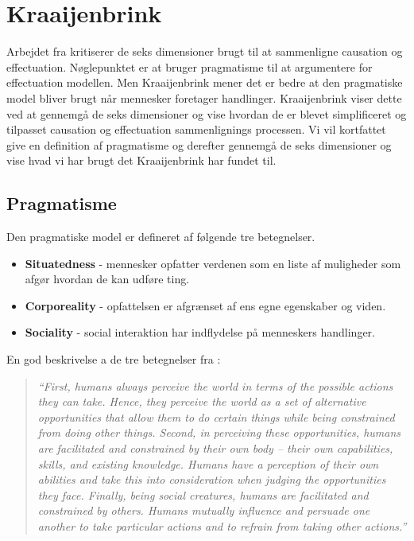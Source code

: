 \section{Kraaijenbrink}
Arbejdet fra \citet{kraaijenbrink2012nature} kritiserer de seks dimensioner brugt til at sammenligne causation og effectuation.
Nøglepunktet er at \citet{sarasvathy2001effectuation} bruger pragmatisme til at argumentere for effectuation modellen.
Men Kraaijenbrink mener det er bedre at den pragmatiske model bliver brugt når mennesker foretager handlinger.
Kraaijenbrink viser dette ved at gennemgå de seks dimensioner og vise hvordan de er blevet simplificeret og tilpasset causation og effectuation sammenlignings processen.
Vi vil kortfattet give en definition af pragmatisme og derefter gennemgå de seks dimensioner og vise hvad vi har brugt det Kraaijenbrink har fundet til.

\subsection{Pragmatisme}
Den pragmatiske model er defineret af følgende tre betegnelser.
\begin{itemize}
\item \textbf{Situatedness} - mennesker opfatter verdenen som en liste af muligheder som afgør hvordan de kan udføre ting.
\item \textbf{Corporeality} - opfattelsen er afgrænset af ens egne egenskaber og viden.
\item \textbf{Sociality} - social interaktion har indflydelse på menneskers handlinger.
\end{itemize}
En god beskrivelse a de tre betegnelser fra \citet{kraaijenbrink2012nature}:
\begin{quote}
  \textit{``First, humans always perceive the world in terms of the possible actions they can take. Hence, they perceive the world as a set of alternative opportunities that allow them to do certain things while being constrained from doing other things. Second, in perceiving these opportunities, humans are facilitated and constrained by their own body – their own capabilities, skills, and existing knowledge. Humans have a perception of their own abilities and take this into consideration when judging the opportunities they face. Finally, being social creatures, humans are facilitated and constrained by others. Humans mutually influence and persuade one another to take particular actions and to refrain from taking other actions.''}
\end{quote}

